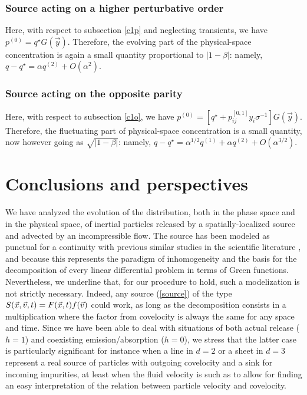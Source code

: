 \subsubsection{Source acting on a higher perturbative order}
%
Here, with respect to subsection \ref{c1p} and neglecting transients, we have $p^{(0)}=q^{\star}G(\vec{y})$.
Therefore, the evolving part of the physical-space concentration is again a small quantity proportional to $|1-\beta|$:
namely, $q-q^{\star}=\alpha q^{(2)}+O(\alpha^2)$.
%
\subsubsection{Source acting on the opposite parity}
%
Here, with respect to subsection \ref{c1o}, we have $p^{(0)}=[q^{\star}+p^{[0,1]}_{ij}y_i\sigma^{-1}]G(\vec{y})$.
Therefore, the fluctuating part of physical-space concentration is a small quantity, now however going as $\sqrt{|1-\beta|}$:
namely, $q-q^{\star}=\alpha^{1/2}q^{(1)}+\alpha q^{(2)}+O(\alpha^{3/2})$.
%
\section{Conclusions and perspectives} \label{concl}
%
We have analyzed the evolution of the distribution, both in the phase space and in the physical space,
of inertial particles released by a spatially-localized source and advected by an incompressible flow.
The source has been modeled as punctual for a continuity with previous similar studies in the scientific literature
\cite{MAM11,CMAM2006,CMAM2007,CMAM07,T18}, and because this represents the paradigm of inhomogeneity and the basis
for the decomposition of every linear differential problem in terms of Green functions.
Nevertheless, we underline that, for our procedure to hold, such a modelization is not strictly necessary.
Indeed, any source (\ref{source}) of the type $S(\vec{x},\vec{v},t)=F(\vec{x},t)f(\vec{v})$ could work, as long as the decomposition
consists in a multiplication where the factor from covelocity is always the same for any space and time.
Since we have been able to deal with situations of both actual release ($h=1$) and coexisting emission/absorption ($h=0$),
we stress that the latter case is particularly significant for instance when a line in $d=2$ or a sheet in $d=3$
represent a real source of particles with outgoing covelocity and a sink for incoming impurities,
at least when the fluid velocity is such as to allow for finding an easy interpretation of the relation between particle velocity and covelocity.

